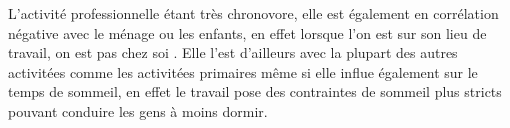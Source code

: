 \documentclass[11pt]{article}
\begin{document}
L'activité professionnelle étant très chronovore, elle est également en corrélation négative avec le ménage ou les enfants, en effet lorsque l'on est sur son lieu de travail, on est pas chez soi . Elle l'est d'ailleurs avec la plupart des autres activitées comme les activitées primaires même si elle influe également sur le temps de sommeil, en effet le travail pose des contraintes de sommeil plus stricts pouvant conduire les gens à moins dormir.

\end{document}
